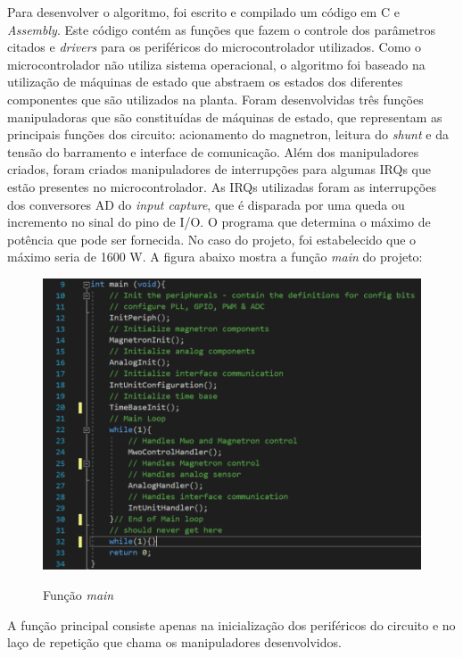 Para desenvolver o algoritmo, foi escrito e compilado um código em C e \textit{Assembly}. Este código contém as funções que fazem o controle dos parâmetros citados e \textit{drivers} para os periféricos do microcontrolador utilizados. Como o microcontrolador não utiliza sistema operacional, o algoritmo foi baseado na utilização de máquinas de estado que abstraem os estados dos diferentes componentes que são utilizados na planta. Foram desenvolvidas três funções manipuladoras que são constituídas de máquinas de estado, que representam as principais funções dos circuito: acionamento do magnetron, leitura do \textit{shunt} e da tensão do barramento e interface de comunicação. Além dos manipuladores criados, foram criados manipuladores de interrupções para algumas IRQs que estão presentes no microcontrolador. As IRQs utilizadas foram as interrupções dos conversores AD do \textit{input capture}, que é disparada por uma queda ou incremento no sinal do pino de I/O. O programa que determina o máximo de potência que pode ser fornecida. No caso do projeto, foi estabelecido que o máximo seria de 1600 W. A figura abaixo mostra a função \textit{main} do projeto:

\begin{figure}[H]
    \centering
    \caption{Função \textit{main}}
    \includegraphics[width=1\textwidth]{./dados/figuras/func_main}
    \label{fig:figura-func-main}
\end{figure}

A função principal consiste apenas na inicialização dos periféricos do circuito e no laço de repetição que chama os manipuladores desenvolvidos.

